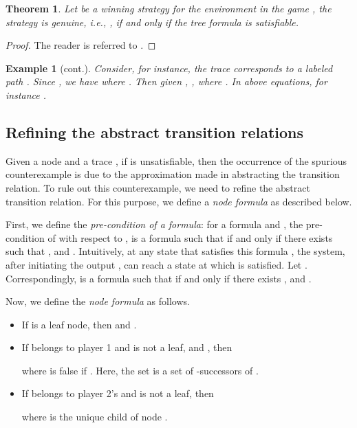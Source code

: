 \documentclass[letterpaper, 10 pt, conference]{ieeeconf}
\newtheorem{theorem}{Theorem}
\newtheorem{example}{Example}
\begin{document}
\begin{theorem}
  Let  be a winning strategy for the environment in the game
  , the strategy  is genuine, i.e.,
  , if and only if the tree formula  is
  satisfiable.
\end{theorem}
\begin{proof}
The reader is referred to  \cite{DimitrovaF08}.
\end{proof}
\addtocounter{example}{-1}
\begin{example}[cont.]
 Consider, for instance, the trace
   corresponds to a labeled path
  . Since , we have 
 where . Then given ,
, where . In above equations, for instance
.
\end{example}

\subsection{Refining the abstract transition relations}
\label{subsec:refinetrans}


Given a node  and a trace , if 
is unsatisfiable, then the occurrence of the spurious counterexample
is due to the approximation made in abstracting the transition
relation. To rule out this counterexample, we need to refine the
abstract transition relation. For this purpose, we define a \emph{node
  formula}  as described below.

First, we define the \emph{pre-condition of a formula}: for a
formula  and , the pre-condition of
 with respect to , 
is a formula such that  if and only if
there exists  such that , 
and . Intuitively, at any state  that satisfies
this formula , the system, after
initiating the output , can reach a state  at which
 is satisfied.  Let . Correspondingly,
 is a formula such that  if and only if there exists ,  and
.

Now, we define the \emph{node formula}  as follows.

\begin{itemize}
\item If  is a leaf node, then 
  and .
\item If  belongs to player 1 and is not a leaf, and , then
\vspace{-1ex}

where  is false if . Here, the set
 is a set of
-successors of . \item If  belongs to player 2's and is not a leaf, then 
\vspace{-0.5ex}

where  is the unique child of node .
\end{itemize}
\end{document}
